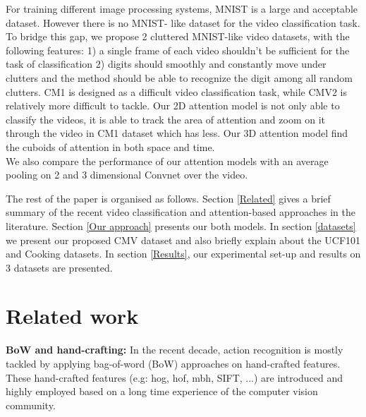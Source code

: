 \documentclass{article} %
\begin{document}
For training different image processing systems, MNIST is a large and acceptable dataset. However there is no MNIST- like dataset for the video classification task. To bridge this gap, we propose 2 cluttered MNIST-like video datasets, with the following features: 1) a single frame of each video shouldn't be sufficient for the task of classification 2) digits should smoothly and constantly move under clutters and the method should be able to recognize the digit among all random clutters. CM1 is designed as a difficult video classification task, while CMV2 is relatively more difficult to tackle. Our 2D attention model is not only able to classify the videos, it is able to track the area of attention and zoom on it through the video in CM1 dataset which has less. Our 3D attention model find the cuboids of attention in both space and time. \\
We also compare the performance of our attention models with an average pooling on 2 and 3 dimensional Convnet over the video.

The rest of the paper is organised as follows.
Section \ref{Related} gives a brief summary of the recent video classification and attention-based approaches in the literature. 
Section \ref{Our approach} presents our both models. In section \ref{datasets} we present our proposed CMV dataset and also briefly explain about the UCF101 and Cooking datasets. In section \ref{Results}, our experimental set-up and results on 3 datasets are presented.

\section{Related work}
\textbf{BoW and hand-crafting:} In the recent decade, action recognition is mostly tackled by applying bag-of-word (BoW) approaches on hand-crafted features. These hand-crafted features (e.g: hog, hof, mbh, SIFT, ...) are introduced and highly employed based on a long time experience of the computer vision community. 
\end{document}
